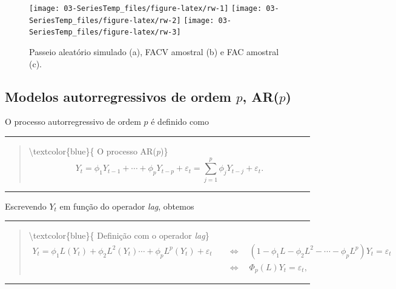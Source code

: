 \documentclass[
]{book}
\theoremstyle{definition}
\theoremstyle{definition}
\theoremstyle{definition}
\theoremstyle{remark}
\begin{document}
\begin{figure}
\texttt{[image: 03-SeriesTemp\_files/figure-latex/rw-1]} \texttt{[image: 03-SeriesTemp\_files/figure-latex/rw-2]} \texttt{[image: 03-SeriesTemp\_files/figure-latex/rw-3]} \caption{ Passeio aleatório simulado (a), FACV amostral (b) e FAC amostral (c).}\label{fig:rw}
\end{figure}

\hypertarget{modelos-autorregressivos-de-ordem-p-arp}{%
\subsection{\texorpdfstring{Modelos autorregressivos de ordem \(p\), AR(\(p\))}{Modelos autorregressivos de ordem p, AR(p)}}\label{modelos-autorregressivos-de-ordem-p-arp}}

O processo autorregressivo de ordem \(p\) é definido como

\begin{center}\rule{0.5\linewidth}{0.5pt}\end{center}

\begin{quote}
\textbackslash textcolor\{blue\}\{ O processo AR(\emph{p})\}\\
\[ Y_t=\phi_1Y_{t-1}+\cdots+\phi_pY_{t-p}+\varepsilon_t=\sum_{j=1}^{p}\phi_jY_{t-j} + \varepsilon_t.\]
\end{quote}

\begin{center}\rule{0.5\linewidth}{0.5pt}\end{center}

Escrevendo \(Y_t\) em função do operador \emph{lag}, obtemos

\begin{center}\rule{0.5\linewidth}{0.5pt}\end{center}

\begin{quote}
\textbackslash textcolor\{blue\}\{ Definição com o operador \emph{lag}\}\\
\begin{align*}
Y_t=\phi_1L(Y_t)+\phi_2L^2(Y_t)\cdots+\phi_pL^p(Y_t)+\varepsilon_t \quad &\Longleftrightarrow \quad (1-\phi_1L-\phi_2L^2-\cdots-\phi_pL^p)Y_t=\varepsilon_t \\
\quad &\Longleftrightarrow \quad  \Phi_p(L)Y_t=\varepsilon_t,
\end{align*}
\end{quote}

\begin{center}\rule{0.5\linewidth}{0.5pt}\end{center}
\end{document}
